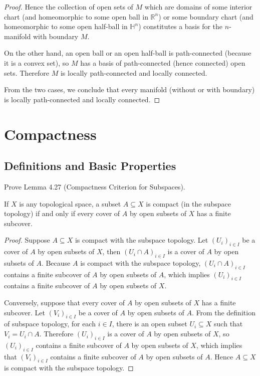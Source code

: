 \begin{proof}
	Hence the collection of open sets of $M$ which are domains of some interior chart (and homeomorphic to some open ball in $\mathbb{R}^{n}$) or some boundary chart  (and homeomorphic to some open half-ball in $\mathbb{H}^{n}$) constitutes a basis for the $n$-manifold with boundary $M$.

	On the other hand, an open ball or an open half-ball is path-connected (because it is a convex set), so $M$ has a basis of path-connected (hence connected) open sets. Therefore $M$ is locally path-connected and locally connected.

	From the two cases, we conclude that every manifold (without or with boundary) is locally path-connected and locally connected.
\end{proof}

\section*{Compactness}

\subsection*{Definitions and Basic Properties}

\begin{exercise}{4.28}
	Prove Lemma 4.27 (Compactness Criterion for Subspaces).

	If $X$ is any topological space, a subset $A\subseteq X$ is compact (in the subspace topology) if and only if every cover of $A$ by open subsets of $X$ has a finite subcover.
\end{exercise}

\begin{proof}
	Suppose $A\subseteq X$ is compact with the subspace topology. Let ${(U_{i})}_{i\in I}$ be a cover of $A$ by open subsets of $X$, then ${(U_{i}\cap A)}_{i\in I}$ is a cover of $A$ by open subsets of $A$. Because $A$ is compact with the subspace topology, ${(U_{i}\cap A)}_{i\in I}$ contains a finite subcover of $A$ by open subsets of $A$, which implies ${(U_{i})}_{i\in I}$ contains a finite subcover of $A$ by open subsets of $X$.

	Conversely, suppose that every cover of $A$ by open subsets of $X$ has a finite subcover. Let ${(V_{i})}_{i\in I}$ be a cover of $A$ by open subsets of $A$. From the definition of subspace topology, for each $i\in I$, there is an open subset $U_{i}\subseteq X$ such that $V_{i} = U_{i}\cap A$. Therefore ${(U_{i})}_{i\in I}$ is a cover of $A$ by open subsets of $X$, so ${(U_{i})}_{i\in I}$ contains a finite subcover of $A$ by open subsets of $X$, which implies that ${(V_{i})}_{i\in I}$ contains a finite subcover of $A$ by open subsets of $A$. Hence $A\subseteq X$ is compact with the subspace topology.
\end{proof}

